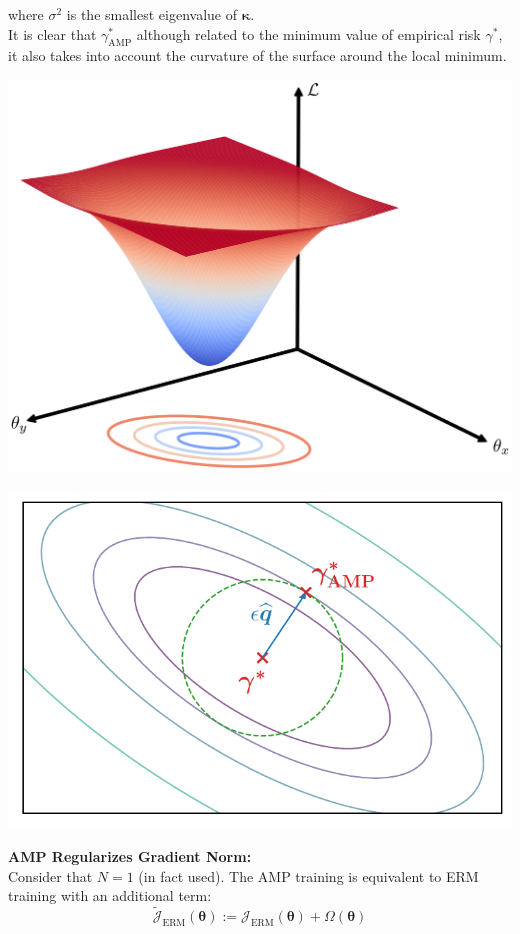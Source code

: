 \documentclass[landscape,a0paper,fontscale=0.3]{baposter}
\begin{document}
\begin{poster}
{\noindent where $\sigma^2$ is the smallest eigenvalue of $\boldsymbol{\kappa}$.\\
It is clear that $\gamma^\ast_\mathrm{AMP}$ although related to the minimum value of empirical risk $\gamma^\ast$, it also takes into account the curvature of the surface around the local minimum.\\
\begin{minipage}{0.99\linewidth}
\centering
\begin{minipage}{0.4\linewidth}
\centering
\includegraphics[width=.8\linewidth]{figs/surface.png}
\end{minipage}
\begin{minipage}{0.4\linewidth}
\centering
\includegraphics[width=.8\linewidth]{figs/gaussian.pdf}
\end{minipage}
\end{minipage}

\textbf{\color{blue}AMP Regularizes Gradient Norm:}\\
Consider that $N=1$ (in fact used). The AMP training is equivalent to ERM training with an additional term:
\vspace{-0.8em}
\begin{equation*}
\widetilde{\mathcal{J}}_\mathrm{ERM}(\boldsymbol{\theta}):=\mathcal{J}_\mathrm{ERM}(\boldsymbol{\theta})+\Omega(\boldsymbol{\theta})
\end{equation*}
\vspace{-2.2em}

}
\end{poster}
\end{document}
